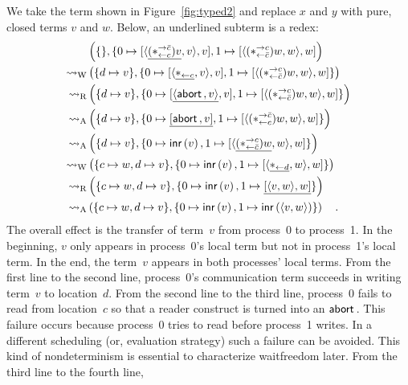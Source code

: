 \begin{example}
 We take the term shown in
 Figure~\ref{fig:typed2} and replace $x$ and $y$ with pure, closed terms
 $v$ and $w$.
 Below, an underlined subterm is a redex:
 \begin{align*}
  &\left(\{\}, \{
  0\mapsto[{\langle{\underline{(\ast^{\rightarrow {\bar{c}}}_{\leftarrow{c}})v},v}\rangle,v}],
  1\mapsto[{\langle{           (\ast^{\rightarrow {c}}_{\leftarrow{\bar{c}}})w ,w}\rangle,w}]
  \right)
  \\   \rightsquigarrow_{\mathrm W} &
  \left( \{d\mapsto v\},
  \{
  0\mapsto [{{\langle{\underline{\ast_{\leftarrow{c}}},  v}\rangle}, v}],
  1\mapsto [{           \langle{(\ast^{\rightarrow {c}}_{\leftarrow{\bar{c}}})w,w}\rangle,w}]
  \}
  \right)
  \\ \rightsquigarrow_{\mathrm R} &
  \left( \{d\mapsto v\},
  \{
  0\mapsto [{\underline{\langle{\mathsf{abort\,},  v}\rangle}, v}],
  1\mapsto [{           \langle{(\ast^{\rightarrow {c}}_{\leftarrow{\bar{c}}})w,w}\rangle,w}]
  \}
  \right)
  \\
  \rightsquigarrow_{\mathrm A} &
  \left(
  \{d\mapsto v\},
  \{
  0\mapsto\underline{[{\mathsf{abort\,},v}]},
  1\mapsto{[{\langle{(\ast^{\rightarrow {\bar{c}}}_{\leftarrow{c}})w,w}\rangle,w}]}
  \}
  \right)
  \\
  \rightsquigarrow_{\mathrm A} &
  \left(\{d\mapsto v\},
  \{
  0\mapsto\mathsf{inr}\left({v}\right),
  1\mapsto[{\langle{\underline{(\ast^{\rightarrow {c}}_{\leftarrow{\bar{c}}})w},w}\rangle,w}]
  \}
  \right)
  \\
  \rightsquigarrow_{\mathrm W} &
  \left(
  \{c\mapsto w, d\mapsto v\}
  ,
  \{
  0\mapsto \mathsf{inr}\left({v}\right),
  1\mapsto [{\langle{\underline{\ast_{\leftarrow{d}}}, w}\rangle, w}]
  \}
  \right)
  \\
  \rightsquigarrow_{\mathrm R} &
  \left(
  \{c\mapsto w, d\mapsto v\}
  ,
  \{
  0\mapsto \mathsf{inr}\left({v}\right),
  1\mapsto \underline{[{\langle{v,w}\rangle,w}]}
  \}
  \right)
  \\
  \rightsquigarrow_{\mathrm A} &
  \left(
  \{c\mapsto w, d\mapsto v\}
  ,
  \{
  0\mapsto \mathsf{inr}\left({v}\right),
  1\mapsto \mathsf{inr}\left({\langle{v,w}\rangle}\right)
  \}
  \right)\quad.
 \end{align*}
 The overall effect is the transfer of term~$v$ from process~0 to
 process~1.  In the beginning, $v$ only appears in process~0's
 local term but not in process~1's local term.  In the end, the
 term~$v$ appears in both processes' local terms.
 From the first line to the second line,
 process~0's communication term succeeds in writing term~$v$ to
 location~$d$.
 From the second line to the third line, process~0 fails to read from
 location~$c$ so that a reader construct is turned into an $\mathsf{abort\,}$.
 This failure occurs because process~0 tries to read before process~1
 writes.  In a different scheduling (or, evaluation strategy) such a
 failure can be avoided.  This kind of nondeterminism is essential to
 characterize waitfreedom later.
 From the third line to the fourth line,

\end{example}
